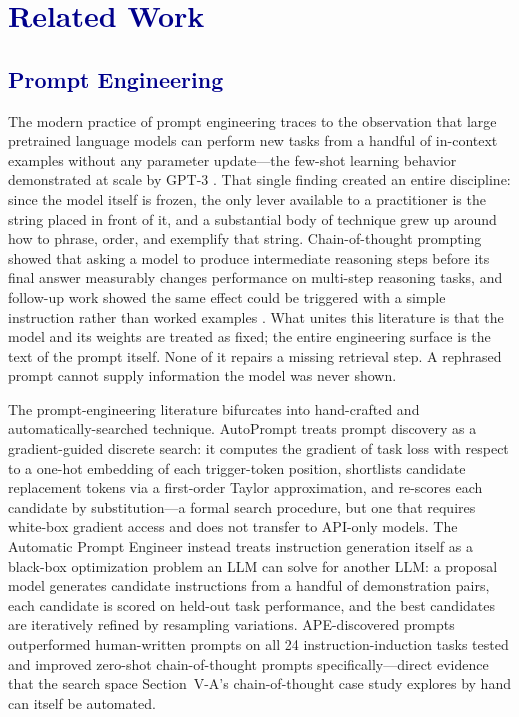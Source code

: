 \documentclass[journal]{IEEEtran}
\begin{document}
\section{\textcolor{darkblue}{Related Work}}

\subsection{\textcolor{darkblue}{Prompt Engineering}}

The modern practice of prompt engineering traces to the observation that large pretrained language models can perform new tasks from a handful of in-context examples without any parameter update---the few-shot learning behavior demonstrated at scale by GPT-3 \cite{brown2020language}. That single finding created an entire discipline: since the model itself is frozen, the only lever available to a practitioner is the string placed in front of it, and a substantial body of technique grew up around how to phrase, order, and exemplify that string. Chain-of-thought prompting \cite{wei2022chain} showed that asking a model to produce intermediate reasoning steps before its final answer measurably changes performance on multi-step reasoning tasks, and follow-up work showed the same effect could be triggered with a simple instruction rather than worked examples \cite{kojima2022large}. What unites this literature is that the model and its weights are treated as fixed; the entire engineering surface is the text of the prompt itself. None of it repairs a missing retrieval step. A rephrased prompt cannot supply information the model was never shown.

The prompt-engineering literature bifurcates into hand-crafted and automatically-searched technique. AutoPrompt \cite{shin2020autoprompt} treats prompt discovery as a gradient-guided discrete search: it computes the gradient of task loss with respect to a one-hot embedding of each trigger-token position, shortlists candidate replacement tokens via a first-order Taylor approximation, and re-scores each candidate by substitution---a formal search procedure, but one that requires white-box gradient access and does not transfer to API-only models. The Automatic Prompt Engineer \cite{zhou2022large} instead treats instruction generation itself as a black-box optimization problem an LLM can solve for another LLM: a proposal model generates candidate instructions from a handful of demonstration pairs, each candidate is scored on held-out task performance, and the best candidates are iteratively refined by resampling variations. APE-discovered prompts outperformed human-written prompts on all 24 instruction-induction tasks tested and improved zero-shot chain-of-thought prompts specifically---direct evidence that the search space Section~V-A's chain-of-thought case study explores by hand can itself be automated.
\end{document}
